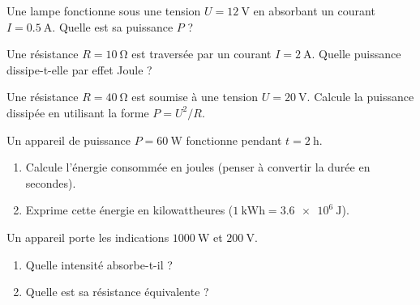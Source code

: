 \documentclass[11pt,a4paper]{article}
\begin{document}
\usetikzlibrary{babel}
\begin{exo}[puissance $P=UI$]
Une lampe fonctionne sous une tension $U=\qty{12}{\volt}$ en absorbant un courant
$I=\qty{0.5}{\ampere}$. Quelle est sa puissance $P$ ?
\end{exo}

\begin{exo}[puissance par effet Joule $P=RI^2$]
Une résistance $R=\qty{10}{\ohm}$ est traversée par un courant $I=\qty{2}{\ampere}$. Quelle puissance
dissipe-t-elle par effet Joule ?
\end{exo}

\begin{exo}[puissance $P=U^2/R$]
Une résistance $R=\qty{40}{\ohm}$ est soumise à une tension $U=\qty{20}{\volt}$. Calcule la puissance
dissipée en utilisant la forme $P=U^2/R$.
\end{exo}

\begin{exo}
Un appareil de puissance $P=\qty{60}{\watt}$ fonctionne pendant $t=\qty{2}{\hour}$.
\begin{enumerate}[label=\alph*)]
  \item Calcule l'énergie consommée en joules (penser à convertir la durée en secondes).
  \item Exprime cette énergie en kilowattheures ($\qty{1}{\kilo\watt\hour}=\qty{3.6e6}{\joule}$).
\end{enumerate}
\end{exo}

\begin{exo}
Un appareil porte les indications $\qty{1000}{\watt}$ et $\qty{200}{\volt}$.
\begin{enumerate}[label=\alph*)]
  \item Quelle intensité absorbe-t-il ?
  \item Quelle est sa résistance équivalente ?
\end{enumerate}
\end{exo}
\end{document}
